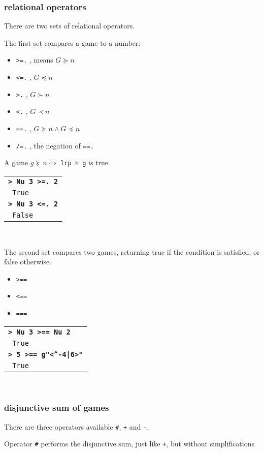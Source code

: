 \documentclass[a4paper,12pt]{article}
\newcommand{\bash}[1]{\small\textbf{\lstinline§> #1§}\\}
\newcommand{\out}[1]{\small\lstinline§ #1§}
\newcommand{\haskellCode}{\fontfamily{pcr}\selectfont}
\newenvironment{sgcode}
	{ \haskellCode
	  \begin{tabular}{|p{0.9\textwidth}|}
      \hline	
	}
	{ \\\hline  
      \end{tabular} \\
	  \par 
	}
\begin{document}
\subsubsection{relational operators}

There are two sets of relational operators.

The first set compares a game to a number:

\begin{itemize} \setlength\itemsep{0.1em}
  \item \verb|>=.| , means $G \succeq n$
  \item \verb|<=.| , $G \preceq n$
  \item \verb|>.| , $G \succ n$
  \item \verb|<.| , $G \prec n$
  \item \verb|==.| , $G \succeq n \wedge G \preceq n$ 
  \item \verb|/=.| , the negation of \verb|==.|
\end{itemize}

A game $g \succeq n \iff$ \verb|lrp n g| is true.

\begin{sgcode}
\bash{Nu 3 >=. 2}
\out{True} \\
\bash{Nu 3 <=. 2}
\out{False} 
\end{sgcode}

The second set compares two games, returning true if the condition is satisfied, or false otherwise.

\begin{itemize} \setlength\itemsep{0.1em}
  \item \verb|>==| 
  \item \verb|<==| 
  \item \verb|===|  
\end{itemize}

\begin{sgcode}
\bash{Nu 3 >== Nu 2}
\out{True} \\
\bash{5 >== g"<^-4|6>"}
\out{True} 
\end{sgcode}

\subsubsection{disjunctive sum of games}

There are three operators available \verb|#|, \verb|+| and \verb|-|.

Operator \verb|#| performs the disjunctive sum, just like \verb|+|, but without simplifications
\end{document}
